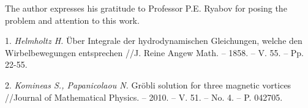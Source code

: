 The author expresses his gratitude to Professor P.E. Ryabov for posing the problem and attention to this work.

\litlist

1. {\it Helmholtz H.}
  \"{U}ber Integrale der hydrodynamischen Glei\-chun\-gen, welche den Wirbelbewegungen entsprechen //J. Reine Angew Math. -- 1858. -- V. 55. -- Pp. 22-55.

2. {\it Komineas S., Papanicolaou N.}
 Gr\"{o}bli solution for three magnetic vortices //Journal of Mathematical Physics. -- 2010. -- V. 51. -- No. 4. -- P. 042705.
%
%



